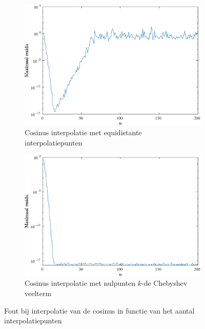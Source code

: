 \documentclass[a4paper, 12pt, titlepage, fleqn]{article}
\begin{document}
\begin{figure}
\begin{subfigure}[b]{0.45\textwidth}
\includegraphics[width=\linewidth]{../Afbeeldingen/cos_equi_fout.eps}
\caption{Cosinus interpolatie met equidistante interpolatiepunten}
\end{subfigure}
\hfill
\begin{subfigure}[b]{0.45\textwidth}
\includegraphics[width=\linewidth]{../Afbeeldingen/cos_nul_fout.eps}
\caption{Cosinus interpolatie met nulpunten $k$-de Chebyshev veelterm}
\end{subfigure}
\caption{Fout bij interpolatie van de cosinus in functie van het aantal interpolatiepunten}
\label{fig:cosFout}
\end{figure}
\end{document}
